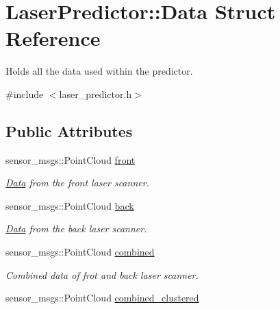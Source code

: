 \hypertarget{structLaserPredictor_1_1Data}{}\section{Laser\+Predictor\+:\+:Data Struct Reference}
\label{structLaserPredictor_1_1Data}


Holds all the data used within the predictor.  




{\ttfamily \#include $<$laser\+\_\+predictor.\+h$>$}

\subsection*{Public Attributes}
\begin{DoxyCompactItemize}
\item 
sensor\+\_\+msgs\+::\+Point\+Cloud \hyperlink{structLaserPredictor_1_1Data_a402dafed5a6071f3878c940e9fce8eb5}{front}\hypertarget{structLaserPredictor_1_1Data_a402dafed5a6071f3878c940e9fce8eb5}{}\label{structLaserPredictor_1_1Data_a402dafed5a6071f3878c940e9fce8eb5}

\begin{DoxyCompactList}\small\item\em \hyperlink{structLaserPredictor_1_1Data}{Data} from the front laser scanner. \end{DoxyCompactList}\item 
sensor\+\_\+msgs\+::\+Point\+Cloud \hyperlink{structLaserPredictor_1_1Data_a28c147023eef318db330a6aaf0ad222e}{back}\hypertarget{structLaserPredictor_1_1Data_a28c147023eef318db330a6aaf0ad222e}{}\label{structLaserPredictor_1_1Data_a28c147023eef318db330a6aaf0ad222e}

\begin{DoxyCompactList}\small\item\em \hyperlink{structLaserPredictor_1_1Data}{Data} from the back laser scanner. \end{DoxyCompactList}\item 
sensor\+\_\+msgs\+::\+Point\+Cloud \hyperlink{structLaserPredictor_1_1Data_a1d152a8b966302e2ffbfa223db50a3a8}{combined}\hypertarget{structLaserPredictor_1_1Data_a1d152a8b966302e2ffbfa223db50a3a8}{}\label{structLaserPredictor_1_1Data_a1d152a8b966302e2ffbfa223db50a3a8}

\begin{DoxyCompactList}\small\item\em Combined data of frot and back laser scanner. \end{DoxyCompactList}\item 
sensor\+\_\+msgs\+::\+Point\+Cloud \hyperlink{structLaserPredictor_1_1Data_a231a9a2d65eb34afc867e406f6304af0}{combined\+\_\+clustered}\hypertarget{structLaserPredictor_1_1Data_a231a9a2d65eb34afc867e406f6304af0}{}\label{structLaserPredictor_1_1Data_a231a9a2d65eb34afc867e406f6304af0}


\end{DoxyCompactItemize}
